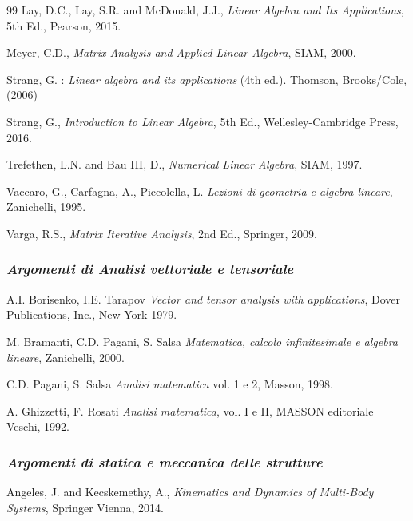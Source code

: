 \begin{thebibliography}{99}
Lay, D.C., Lay, S.R. and McDonald, J.J., {\em Linear Algebra and Its Applications}, 5th Ed., Pearson, 2015.

Meyer, C.D., {\em Matrix Analysis and Applied Linear Algebra}, SIAM, 2000.

Strang, G. :
\textit{Linear algebra and its applications} (4th ed.).
Thomson, Brooks/Cole, (2006)

Strang, G., {\em Introduction to Linear Algebra}, 5th Ed., Wellesley-Cambridge Press, 2016.

Trefethen, L.N. and Bau III, D., {\em Numerical Linear Algebra}, SIAM, 1997.

Vaccaro, G., Carfagna, A., Piccolella, L. {\em Lezioni di geometria e  algebra lineare}, Zanichelli,  1995.

Varga, R.S., {\em Matrix Iterative Analysis}, 2nd Ed., Springer, 2009.




\vspace{0.6 cm}
\subsubsection{\emph{Argomenti di Analisi vettoriale e tensoriale}}


A.I. Borisenko, I.E. Tarapov {\em Vector and tensor analysis with
	applications}, Dover Publications, Inc., New York 1979.


M. Bramanti, C.D. Pagani, S. Salsa \emph{Matematica, calcolo
	infinitesimale e algebra lineare}, Zanichelli, 2000.


C.D. Pagani, S. Salsa \emph{Analisi matematica} vol. 1 e 2, Masson, 1998.


A. Ghizzetti, F. Rosati {\em Analisi matematica}, vol. I e II,
MASSON editoriale Veschi, 1992.





\vspace{0.6 cm}
\subsubsection{\emph{Argomenti di statica e meccanica delle strutture}}



Angeles, J. and Kecskemethy, A., {\em Kinematics and Dynamics of Multi-Body Systems}, Springer Vienna, 2014.


\end{thebibliography}
